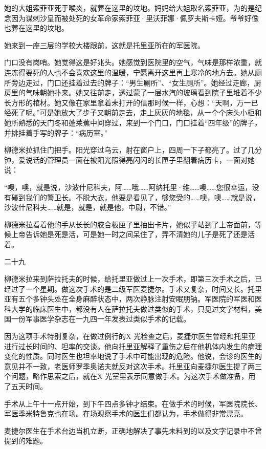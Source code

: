 她的大姐索菲亚死于喉炎，就葬在这里的坟地。妈妈给大姐取名索菲亚，为的是纪念因为谋刺沙皇而被处死的女革命家索菲亚·里沃菲娜·佩罗夫斯卡娅。爷爷好像也葬在这里的坟地。

她来到一座三层的学校大楼跟前，这就是托里亚所在的军医院。

门口没有岗哨。她觉得这是好兆头。她感觉到医院里的空气，气味是那样浓重，就连冻得要死的人也不会喜欢这里的温暖，宁愿离开这里再上寒冷的地方去。她从厕所旁边走过，门口还挂着过去的牌子：“男生厕所”、“女生厕所”。她经过走廊，厨房里的气味朝她扑来。她又往前走，透过蒙了一层水汽的玻璃看到院子里堆着不少长方形的棺材。她又像在家里拿着未打开的信那时候一样，心想：“天啊，万一已经死了呢。”可是她放大了步子又朝前走去，走上灰灰的地毯，从一个个床头小柜和她所熟悉的天门冬和蓬莱蕉中间穿过，来到一个门口，门口挂着“四年级”的牌子，并排挂着手写的牌子：“病历室。”

柳德米拉抓住门把手。阳光穿过乌云，射在窗户上，四周一下子都亮了。过了几分钟，爱说话的管理员一面在被阳光照得亮闪闪的长匣子里翻着病历卡，一面对她说：

“噢，噢，就是说，沙波什尼科夫，阿……哦……阿纳托里·维……噢……您很幸运，没有碰到我们的警卫长。不脱大衣，他要是看见了，够您受的……噢，噢……就是说，沙波什尼科夫……就是，就是，就是他，中尉，不错。”

柳德米拉看着他的手从长长的胶合板匣子里抽出卡片，她似乎站到了上帝面前，等候上帝告诉她是死是活，可是她一时之间呆住了，弄不清她的儿子是死了还是活着。

二十九

柳德米拉来到萨拉托夫的时候，给托里亚做过上一次手术，即第三次手术之后，已经过了一个星期。做这次手术的是二级军医麦捷尔。手术又复杂，时间又长。托里亚有五个多钟头处在全身麻醉状态中，两次静脉注射安眠朋钠。军医院的军医和医科大学的临床医生中，都没有人在萨拉托夫做过类似的手术，只见过文字材料，美国一份军事医学杂志在一九四一年发表过类似手术的记载。

因为这项手术特别复杂，在做过例行的X 光检查之后，麦捷尔医生曾经和托里亚进行过长时间的、坦率的交谈。他向托里亚解释了重伤之后在他机体内发生的病理变化的性质。同时医生也坦率地说了手术中可能出现的危险。他说，会诊的医生的意见并不一致，老医师罗季奥诺夫就反对这次手术。托里亚向麦捷尔医生提了两三个问题，略作思索之后，就在X 光室里表示同意做手术。为这次手术做准备，用了五天时间。

手术从上午十一点开始，到下午四点多钟才结束。在做手术的时候，军医院院长、军医季米特鲁克也在场。在场观察手术的医生们都认为，手术做得非常漂亮。

麦捷尔医生在手术台边当机立断，正确地解决了事先未料到的以及文字记录中不曾提到的难题。

